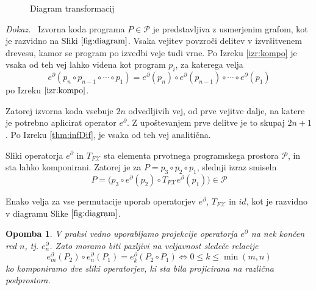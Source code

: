 \documentclass[a4paper, 12pt]{book}
\newcommand{\X}{\mathcal{X}}
\newcommand{\dP}{\mathcal{P}}
\newcommand{\D}{\partial}
\newtheorem{opomba}{Opomba}[chapter]
\newenvironment{dokaz}{\emph{Dokaz.}\ }{\hspace{\fill}{$\Box$}}
\begin{document}
\begin{figure}
\begin{center}
\caption{Diagram transformacij} \label{fig:diagram}
\end{center}
\end{figure}
\begin{dokaz}
	Izvorna koda programa $P\in\dP$ je predstavljiva z usmerjenim grafom, kot je razvidno na Sliki $\ref{fig:diagram}$.
	Vsaka vejitev povzroči delitev v izvršitvenem drevesu, kamor se program po izvedbi veje tudi vrne. Po Izreku \ref{izr:kompo} je vsaka od teh vej lahko videna kot program $p_i$, za katerega velja
	$$e^\D(p_n\circ p_{n-1}\circ\cdots\circ p_1)=e^\D(p_n)\circ e^\D(p_{n-1})\circ\cdots\circ e^\D(p_1)$$ po Izreku $\ref{izr:kompo}$.
	
	Zatorej izvorna koda vsebuje $2n$ odvedljivih vej, od prve vejitve dalje, na katere je potrebno aplicirat operator $e^\D$. Z upoštevanjem prve delitve je to skupaj $2n+1$. Po Izreku \ref{thm:infDif}, je vsaka od teh vej analitična.
\end{dokaz}

Sliki operatorja $e^\D$ in $T_{F\X}$  sta elementa prvotnega programskega prostora $\dP$, in sta lahko komponirani. Zatorej je za $P=p_3\circ p_2\circ p_1$, slednji izraz smiseln
\begin{equation*}\label{trd:composeOperators}
P=\Big(p_3\circ e^ \D(p_2)\circ T_{F\X}e^\D(p_1)\Big) \in \dP
\end{equation*}

\noindent Enako velja za vse permutacije uporab operatorjev $e^\D$, $T_{F\X}$ in $id$, kot je razvidno v diagramu Slike $\ref{fig:diagram}$.

\begin{opomba}
V praksi vedno uporabljamo projekcije operatorja $e^\D$ na nek končen red $n$, tj. $e^\D_n$. Zato moramo biti pazljivi na veljavnost sledeče relacije
\begin{equation*}
e^\D_m(P_2)\circ e^\D_n(P_1)=e^\D_k(P_2\circ P_1)\iff 0\le k\le \min(m,n)
\end{equation*}
ko komponiramo dve sliki operatorjev, ki sta bila projicirana na različna podprostora.
\end{opomba}
\end{document}
